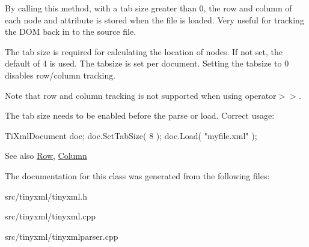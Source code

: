 By calling this method, with a tab size greater than 0, the row and column of each node and attribute is stored when the file is loaded. Very useful for tracking the D\+OM back in to the source file.

The tab size is required for calculating the location of nodes. If not set, the default of 4 is used. The tabsize is set per document. Setting the tabsize to 0 disables row/column tracking.

Note that row and column tracking is not supported when using operator$>$$>$.

The tab size needs to be enabled before the parse or load. Correct usage\+: \begin{DoxyVerb}TiXmlDocument doc;
doc.SetTabSize( 8 );
doc.Load( "myfile.xml" );
\end{DoxyVerb}


\begin{DoxySeeAlso}{See also}
\hyperlink{classTiXmlBase_a024bceb070188df92c2a8d8852dd0853}{Row}, \hyperlink{classTiXmlBase_ab54bfb9b70fe6dd276e7b279cab7f003}{Column} 
\end{DoxySeeAlso}


The documentation for this class was generated from the following files\+:\begin{DoxyCompactItemize}
\item 
src/tinyxml/tinyxml.\+h\item 
src/tinyxml/tinyxml.\+cpp\item 
src/tinyxml/tinyxmlparser.\+cpp\end{DoxyCompactItemize}
